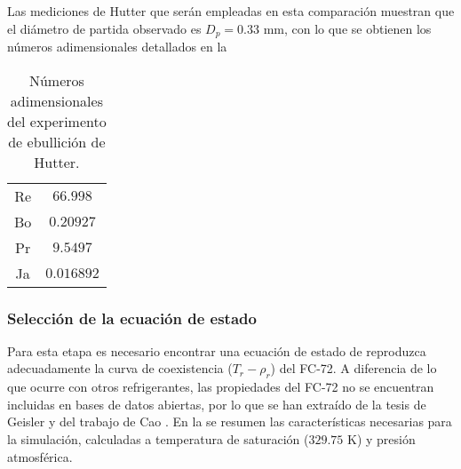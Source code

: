 Las mediciones de Hutter que ser\'an empleadas en esta comparaci\'on muestran que el di\'ametro de partida observado es $D_p=0.33$ mm, con lo que se obtienen los n\'umeros adimensionales detallados en la 
\begin{table}[ht]
	\centering
    \begin{tabular}{c c}
	    \toprule
		Re & $66.998$  \\
		Bo & $0.20927$ \\
		Pr & $9.5497$ \\
		Ja & $0.016892$ \\
        \bottomrule
	\end{tabular}
	\caption{N\'umeros adimensionales del experimento de ebullici\'on de Hutter.}
	\label{tab:exp_adim}
\end{table} 


\subsubsection{Selecci\'on de la ecuaci\'on de estado}

Para esta etapa es necesario encontrar una ecuaci\'on de estado de reproduzca adecuadamente la curva de coexistencia ($T_r - \rho_r$) del FC-72. A diferencia de lo que ocurre con otros refrigerantes, las propiedades del FC-72 no se encuentran incluidas en bases de datos abiertas, por lo que se han extra\'ido de la tesis de Geisler \cite{larson_geisler_buoyancy-driven_2007} y del trabajo de Cao \cite{cao_experimental_2019}. En la  se resumen las caracter\'isticas necesarias para la simulaci\'on, calculadas a temperatura de saturaci\'on ($329.75$ K) y presi\'on atmosf\'erica.

